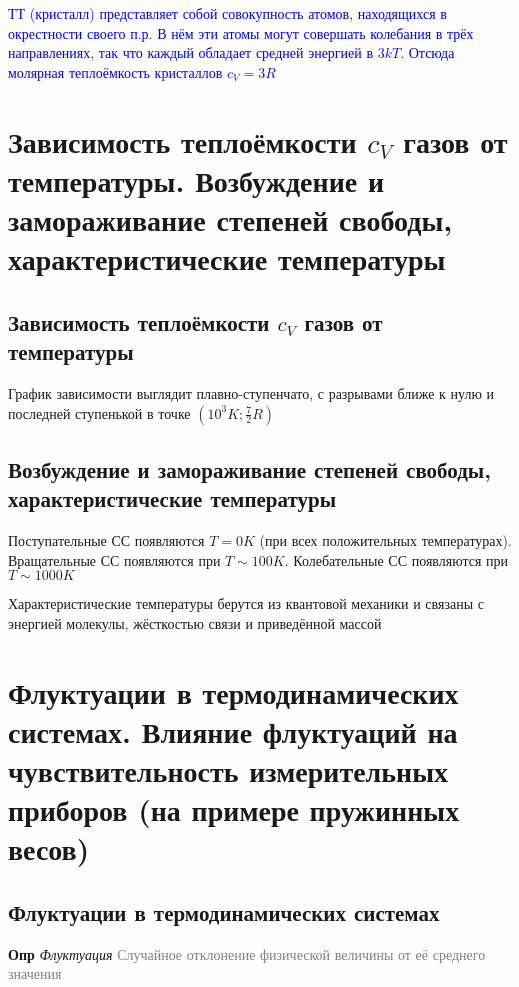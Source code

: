 \documentclass[a4paper, 14pt]{article}
\begin{document}
    \textcolor{blue}{ТТ (кристалл) представляет собой совокупность атомов, находящихся в окрестности своего п.р.
    В нём эти атомы могут совершать колебания в трёх направлениях, так что каждый обладает средней энергией в $3kT$.
    Отсюда молярная теплоёмкость кристаллов $c_V = 3R$}
    
    \section{Зависимость теплоёмкости $c_V$ газов от температуры.
    Возбуждение и замораживание степеней свободы, характеристические температуры}
    
    \subsection{Зависимость теплоёмкости $c_V$ газов от температуры}
    
    График зависимости выглядит плавно-ступенчато, с разрывами ближе к нулю и последней ступенькой в точке
    $(10^3 K; \frac{7}{2}R)$
    
    \subsection{Возбуждение и замораживание степеней свободы, характеристические температуры}
    
    Поступательные СС появляются $T = 0 K$ (при всех положительных температурах).
    Вращательные СС появляются при $T \sim 100 K$.
    Колебательные СС появляются при $T \sim 1000 K$
    
    Характеристические температуры берутся из квантовой механики и связаны с энергией молекулы, жёсткостью связи и
    приведённой массой
    
    \section{Флуктуации в термодинамических системах.
    Влияние флуктуаций на чувствительность измерительных приборов (на примере пружинных весов)}
    
    \subsection{Флуктуации в термодинамических системах}
    
    \textbf{Опр} \textit{Флуктуация} \textcolor{gray}{Случайное отклонение физической величины от её среднего значения}
    
\end{document}
